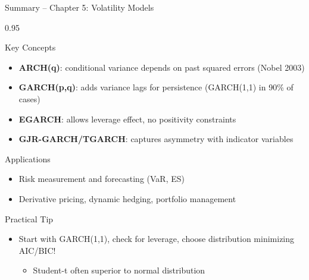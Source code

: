 \documentclass[9pt, aspectratio=169, t]{beamer}
\begin{document}
\begin{frame}{Summary -- Chapter 5: Volatility Models}
\small
    \vspace{-0.2cm}
    \begin{cminipage}{0.95\textwidth}
    \begin{block}{Key Concepts}
        \begin{itemize}\setlength{\itemsep}{0pt}
            \item \textbf{ARCH(q)}: conditional variance depends on past squared errors (Nobel 2003)
            \item \textbf{GARCH(p,q)}: adds variance lags for persistence (GARCH(1,1) in 90\% of cases)
            \item \textbf{EGARCH}: allows leverage effect, no positivity constraints
            \item \textbf{GJR-GARCH/TGARCH}: captures asymmetry with indicator variables
        \end{itemize}
    \end{block}
    \vspace{-0.2cm}
    \begin{block}{Applications}
        \begin{itemize}\setlength{\itemsep}{0pt}
            \item Risk measurement and forecasting (VaR, ES)
            \item Derivative pricing, dynamic hedging, portfolio management
        \end{itemize}
    \end{block}
    \vspace{-0.2cm}
    \begin{alertblock}{Practical Tip}
        \begin{itemize}\setlength{\itemsep}{0pt}
            \item Start with GARCH(1,1), check for leverage, choose distribution minimizing AIC/BIC!
                \begin{itemize}\setlength{\itemsep}{0pt}
                    \item Student-t often superior to normal distribution
                \end{itemize}
        \end{itemize}
    \end{alertblock}
    \end{cminipage}
\end{frame}
\end{document}
